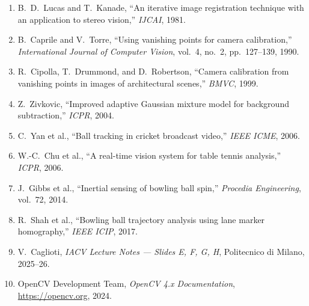 \documentclass[11pt,twoside]{article}
\begin{document}
\begin{enumerate}
    \item \label{lucas1981} B.~D.\ Lucas and T.\ Kanade, ``An iterative image registration technique with an application to stereo vision,'' \textit{IJCAI}, 1981.
    \item \label{caprile1990} B.~Caprile and V.~Torre, ``Using vanishing points for camera calibration,'' \textit{International Journal of Computer Vision}, vol.~4, no.~2, pp.~127--139, 1990.
    \item \label{cipolla1999} R.~Cipolla, T.~Drummond, and D.~Robertson, ``Camera calibration from vanishing points in images of architectural scenes,'' \textit{BMVC}, 1999.
    \item \label{zivkovic2004} Z.~Zivkovic, ``Improved adaptive Gaussian mixture model for background subtraction,'' \textit{ICPR}, 2004.
    \item \label{yan2006} C.~Yan et al., ``Ball tracking in cricket broadcast video,'' \textit{IEEE ICME}, 2006.
    \item \label{chu2006} W.-C.\ Chu et al., ``A real-time vision system for table tennis analysis,'' \textit{ICPR}, 2006.
    \item \label{gibbs2014} J.~Gibbs et al., ``Inertial sensing of bowling ball spin,'' \textit{Procedia Engineering}, vol.~72, 2014.
    \item \label{shah2017} R.~Shah et al., ``Bowling ball trajectory analysis using lane marker homography,'' \textit{IEEE ICIP}, 2017.
    \item \label{caglioti2025} V.~Caglioti, \textit{IACV Lecture Notes --- Slides E, F, G, H}, Politecnico di Milano, 2025--26.
    \item OpenCV Development Team, \textit{OpenCV 4.x Documentation}, \url{https://opencv.org}, 2024.
\end{enumerate}
\end{document}
